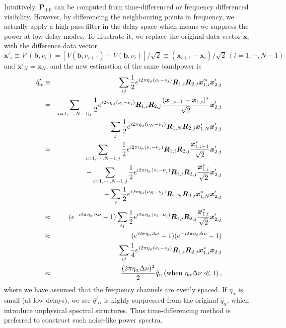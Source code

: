\documentclass[12pt,a4paper]{article}
\begin{document}
Intuitively, $\bm{P}_\text{diff}$ can be computed from time-differenced or frequency differenced visibility. However, by differencing the neighbouring points in frequency, we actually apply a high-pass filter in the delay space which means we suppress the power at low delay modes. To illustrate it, we replace the original data vector $\bm{x}_i$ with the difference data vector $\bm{x}'_i \equiv V'(\bm{b},\nu_i) = \left[V(\bm{b},\nu_{i+1})-V(\bm{b},\nu_i)\right] / \sqrt{2} \equiv \left(\bm{x}_{i+1} - \bm{x}_i\right)/\sqrt{2}\, (i=1,\cdots,N-1)$ and $\bm{x}'_N = \bm{x}_N$, and the new estimation of the same bandpower is %
\begin{eqnarray}
    \hat{q}'_\alpha & \equiv & \sum_{ij}\frac{1}{2}e^{i2\pi\eta_\alpha(\nu_i - \nu_j)}\bm{R}_{1,i}\bm{R}_{2,j} \bm{x}'^*_{1,i} \bm{x}'_{2,j} \notag \\
    & = &\sum_{i=1,\cdots, N-1;j}\frac{1}{2}e^{i2\pi\eta_\alpha(\nu_i - \nu_j)} \bm{R}_{1,i}\bm{R}_{2,j} \frac{(\bm{x}_{1,i+1}-\bm{x}_{1,i})^*}{\sqrt{2}} \bm{x}'_{2,j} \notag \\
    & \phantom{=} & + \sum_{j} \frac{1}{2} e^{i2\pi\eta_\alpha(\nu_N - \nu_j)} \bm{R}_{1,N}\bm{R}_{2,j} \bm{x}_{1,N}^* \bm{x}'_{2,j} \notag \\ 
    & = & \sum_{i=1,\cdots, N-1;j}\frac{1}{2} e^{i2\pi\eta_\alpha(\nu_i - \nu_j)} \bm{R}_{1,i}\bm{R}_{2,j} \frac{\bm{x}^*_{1,i+1}}{\sqrt{2}} \bm{x}'_{2,j}\notag \\ 
    & \phantom{=} & - \sum_{i=1,\cdots, N-1;j}\frac{1}{2} e^{i2\pi\eta_\alpha(\nu_i - \nu_j)} \bm{R}_{1,i}\bm{R}_{2,j} \frac{\bm{x}^*_{1,i}}{\sqrt{2}} \bm{x}'_{2,j} \notag \\
    & \phantom{=} & + \sum_{j} \frac{1}{2} e^{i2\pi\eta_\alpha(\nu_N - \nu_j)} \bm{R}_{1,N}\bm{R}_{2,j} \bm{x}_{1,N}^* \bm{x}'_{2,j} \notag \\
    & \approx & (e^{-i2\pi\eta_\alpha \Delta\nu} -1 )\sum_{ij} \frac{1}{2} e^{i2\pi\eta_\alpha(\nu_i-\nu_j)} \bm{R}_{1,i}\bm{R}_{2,j} \frac{\bm{x}^*_{1,i}}{\sqrt{2}} \bm{x}'_{2,j} \notag \\
    & \approx & (e^{i2\pi\eta_\alpha \Delta\nu} -1 )(e^{-i2\pi\eta_\alpha \Delta\nu} -1 ) \notag \\
    & \phantom{=} &\sum_{ij} \frac{1}{4}e^{i2\pi\eta_\alpha(\nu_i-\nu_j)} \bm{R}_{1,i}\bm{R}_{2,j} \bm{x}^*_{1,i} \bm{x}_{2,j} \notag \\
    & \approx & \frac{(2\pi\eta_\alpha\Delta \nu)^2}{2} \hat{q}_\alpha \, (\text{when} \,\, \eta_\alpha \Delta\nu \ll 1)\,,
\end{eqnarray}
where we have assumed that the frequency channels are evenly spaced. If $\eta_\alpha$ is small (at low delays), we see $\hat{q}'_\alpha$ is highly suppressed from the original $\hat{q}_\alpha$, which introduce unphysical spectral structures. Thus time-differencing method is preferred to construct such noise-like power spectra.
\end{document}
